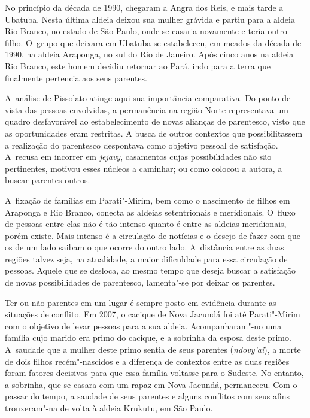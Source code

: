 No princípio da década de 1990, chegaram a Angra dos Reis, e mais tarde
a Ubatuba. Nesta última aldeia deixou sua mulher grávida e partiu para
a aldeia Rio Branco, no estado de São Paulo, onde se casaria novamente
e teria outro filho. O~grupo que deixara em Ubatuba se estabeleceu, em
meados da década de 1990, na aldeia Araponga, no sul do Rio de Janeiro.
Após cinco anos na aldeia Rio Branco, este homem decidiu retornar ao
Pará, indo para a terra que finalmente pertencia aos seus parentes.

A~análise de Pissolato atinge aqui sua importância comparativa. Do ponto
de vista das pessoas envolvidas, a permanência na região Norte
representava um quadro desfavorável ao estabelecimento de novas
alianças de parentesco, visto que as oportunidades eram restritas. A
busca de outros contextos que possibilitassem a realização do
parentesco despontava como objetivo pessoal de satisfação. A~recusa em
incorrer em \emph{jejavy}, casamentos cujas possibilidades não são
pertinentes, motivou esses núcleos a caminhar; ou como colocou a
autora, a buscar parentes outros. 

A~fixação de famílias em Parati"-Mirim, bem como o nascimento de filhos
em Araponga e Rio Branco, conecta as aldeias setentrionais e
meridionais. O~fluxo de pessoas entre elas não é tão intenso quanto é
entre as aldeias meridionais, porém existe. Mais intenso é a circulação
de notícias e o desejo de fazer com que os de um lado saibam o que
ocorre do outro lado. A~distância entre as duas regiões talvez seja, na
atualidade, a maior dificuldade para essa circulação de pessoas. Aquele
que se desloca, ao mesmo tempo que deseja buscar a satisfação de novas
possibilidades de parentesco, lamenta"-se por deixar os parentes. 

Ter ou não parentes em um lugar é sempre posto em evidência durante as
situações de conflito. Em 2007, o cacique de Nova Jacundá foi até
Parati"-Mirim com o objetivo de levar pessoas para a sua aldeia.
Acompanharam"-no uma família cujo marido era primo do cacique, e a
sobrinha da esposa deste primo. A~saudade que a mulher deste primo
sentia de seus parentes (\emph{ndovy’ai}), a morte de dois filhos
recém"-nascidos e a diferença de contextos entre as duas regiões foram
fatores decisivos para que essa família voltasse para o Sudeste. No
entanto, a sobrinha, que se casara com um rapaz em Nova Jacundá,
permaneceu. Com o passar do tempo, a saudade de seus parentes e alguns
conflitos com seus afins trouxeram"-na de volta à aldeia Krukutu, em São
Paulo.

